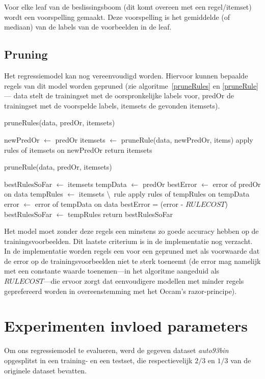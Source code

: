 \documentclass[a4paper,dutch,11pt,]{article}
\begin{document}
Voor elke leaf van de beslissingsboom (dit komt overeen met een regel/itemset) wordt een voorspelling gemaakt. Deze voorspelling is het gemiddelde (of mediaan) van de labels van de voorbeelden in de leaf.

\subsection{Pruning}
Het regressiemodel kan nog vereenvoudigd worden. Hiervoor kunnen bepaalde regels van dit model worden gepruned (zie algoritme~\ref{pruneRules} en \ref{pruneRule} --- data stelt de trainingset met de oorspronkelijke labels voor, predOr de trainingset met de voorspelde labels, itemsets de gevonden itemsets). 

\begin{algorithm}[hbpt]
\caption{pruneRules(data, predOr, itemsets)}
\label{pruneRules}
newPredOr $\leftarrow$ predOr\;
{
itemsets $\leftarrow$ pruneRule(data, newPredOr, items)\;
apply rules of itemsets on newPredOr\;   
}
return itemsets\;
\end{algorithm}


\begin{algorithm}[hbpt]
\caption{pruneRule(data, predOr, itemsets)}
\label{pruneRule}
bestRulesSoFar $\leftarrow$ itemsets\;
tempData $\leftarrow$ predOr\;
bestError $\leftarrow$ error of predOr on data\;
{
tempRules $\leftarrow$ itemsets \textbackslash\ rule\;
apply rules of tempRules on tempData\;
error $\leftarrow$ error of tempData on data\;
{
bestError = (error - $RULECOST$)\;
bestRulesSoFar $\leftarrow$ tempRules\;
}
}
return bestRulesSoFar\;
\end{algorithm}

Het model moet zonder deze regels een minstens zo goede accuracy hebben op de trainingsvoorbeelden. Dit laatste criterium is in de implementatie nog verzacht. In de implementatie worden regels een voor een gepruned met als voorwaarde dat de error op de trainingsvoorbeelden niet te sterk toeneemt (de error mag namelijk met een constante waarde toenemen---in het algoritme aangeduid als $RULECOST$---die ervoor zorgt dat eenvoudigere modellen met minder regels geprefereerd worden in overeenstemming met het Occam's razor-principe).


\section{Experimenten invloed parameters}
Om ons regressiemodel te evalueren, werd de gegeven dataset \emph{auto93bin} opgesplitst in een training- en een testset, die respectievelijk $2/3$ en $1/3$ van de originele dataset bevatten. 
\end{document}
